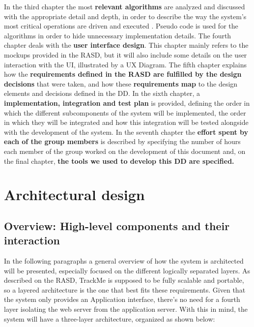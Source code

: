 \documentclass[12pt]{article}
\begin{document}
\noindent 
In the third chapter the most \textbf{relevant algorithms} are analyzed and discussed with the appropriate
detail and depth, in order to describe the way the system’s most critical operations are driven and executed
. Pseudo code is used for the algorithms in order to hide unnecessary implementation details.
The fourth chapter deals with the \textbf{user interface design}. This chapter mainly refers to the mockups 
provided in the RASD, but it will also include some details on the user interaction with the UI, illustrated
by a UX Diagram.
The fifth chapter explains how the \textbf{requirements defined in the RASD are fulfilled by the design 
decisions} that were taken, and how these \textbf{requirements map} to the design elements and decisions 
defined in the DD.
In the sixth chapter, a \textbf{implementation, integration and test plan} is provided, defining the 
order in which the different subcomponents of the system will be implemented, the 
order in which they will be integrated and how this integration will be tested alongside with the
development of the system.
In the seventh chapter the \textbf{effort spent by each of the group members} is described by specifying the
number of hours each member of the group worked on the development of this document and, on the final
chapter, \textbf{the tools we used to develop this DD are specified.}  


\section{Architectural design}

\subsection{Overview: High-level components and their interaction}
In the following paragraphs a general overview of how the system is architected will be presented,
especially focused on the different logically separated layers. As described on the RASD, TrackMe is
supposed to be fully scalable and portable, so a layered architecture is the one that best fits these
requirements. Given that the system only provides an Application interface, there’s no need for a fourth
layer isolating the web server from the application server.
With this in mind, the system will have a three-layer architecture, organized as shown below:
\end{document}
